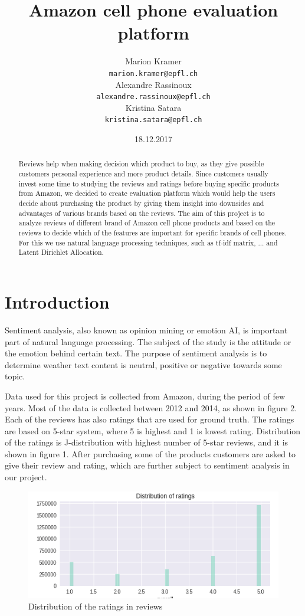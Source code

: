 \documentclass[11pt]{article}
\title{Amazon cell phone evaluation platform}
\author{Marion Kramer\\
  {\tt marion.kramer@epfl.ch} \\\And
  Alexandre Rassinoux \\
  {\tt alexandre.rassinoux@epfl.ch} \\\And
Kristina Satara \\
{\tt kristina.satara@epfl.ch} \\}
\date{18.12.2017}
\begin{document}
\maketitle
\begin{abstract}
Reviews help when making decision which product to buy, as they give possible customers personal experience and more product details. Since customers usually invest some time to studying the reviews and ratings before buying specific products from Amazon, we decided to create evaluation platform which would help the users decide about purchasing the product by giving them insight into  downsides and advantages of various brands based on the reviews. The aim of this project is to analyze reviews of different brand of Amazon cell phone products and based on the reviews to decide which of the features are important for specific brands of cell phones. For this we use natural language processing techniques, such as tf-idf matrix, ...  and Latent Dirichlet Allocation.
\end{abstract}


\section{Introduction}
Sentiment analysis, also known as opinion mining or emotion AI, is important part of natural language processing. The subject of the study is the attitude or the emotion behind certain text. The purpose of sentiment analysis is to determine weather text content is neutral, positive or negative towards some topic. 

Data used for this project is collected from Amazon, during the period of few years. Most of the data is collected between 2012 and 2014, as shown in figure 2. Each of the reviews has also ratings that are used for ground truth. The ratings are based on 5-star system, where 5 is highest and 1 is lowest rating. Distribution of the ratings is J-distribution with highest number of 5-star reviews, and it is shown in figure 1. After purchasing some of the products customers are asked to give their review and rating, which are further subject to sentiment analysis in our project. 



\begin{figure}[h!]
  \centering
    \includegraphics[width=\linewidth]{ratingDistribution.png}
  \caption{Distribution of the ratings in reviews}
  \label{fig:ratingDistribution}
\end{figure}
\end{document}

